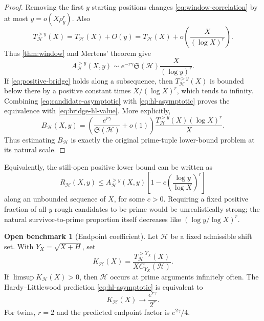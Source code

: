 \documentclass[11pt]{article}
\theoremstyle{definition}
\newtheorem{benchmark}[theorem]{Open benchmark}
\theoremstyle{remark}
\newcommand{\cH}{\mathcal H}
\begin{document}
\begin{proof}
Removing the first $y$ starting positions changes \eqref{eq:window-correlation} by at most $y=o(X\rho_y^r)$.  Also
\begin{equation}\label{eq:mesoscopic-prime-head}
    T_{\cH}^{>y}(X)=T_{\cH}(X)+O(y)
    =T_{\cH}(X)+o\left(\frac{X}{(\log X)^r}\right).
\end{equation}
Thus \cref{thm:window} and Mertens' theorem give
\begin{equation}\label{eq:candidate-asymptotic}
 A_{\cH}^{>y}(X,y)
 \sim e^{-r\gamma}\mathfrak S(\cH)
       \frac{X}{(\log y)^r}.
\end{equation}
If \eqref{eq:positive-bridge} holds along a subsequence, then $T_{\cH}^{>y}(X)$ is bounded below there by a positive constant times $X/(\log X)^r$, which tends to infinity.  Combining \eqref{eq:candidate-asymptotic} with \eqref{eq:hl-asymptotic} proves the equivalence with \eqref{eq:bridge-hl-value}.
More explicitly,
\begin{equation}\label{eq:bridge-benchmark-identity}
 B_{\cH}(X,y)
 =\left(\frac{e^{r\gamma}}{\mathfrak S(\cH)}+o(1)\right)
   \frac{T_{\cH}^{>y}(X)(\log X)^r}{X}.
\end{equation}
Thus estimating $B_{\cH}$ is exactly the original prime-tuple lower-bound problem at its natural scale.
\end{proof}

Equivalently, the still-open positive lower bound can be written as
\begin{equation}\label{eq:remainder-target}
 R_{\cH}(X,y)
 \le A_{\cH}^{>y}(X,y)
 \left[1-c\left(\frac{\log y}{\log X}\right)^r\right]
\end{equation}
along an unbounded sequence of $X$, for some $c>0$.  Requiring a fixed positive fraction of all $y$-rough candidates to be prime would be unrealistically strong; the natural survivor-to-prime proportion itself decreases like $(\log y/\log X)^r$.

\begin{benchmark}[Endpoint coefficient]\label{crit:endpoint}
Let $\cH$ be a fixed admissible shift set.  With $Y_X=\sqrt{X+H}$, set
\begin{equation}\label{eq:endpoint-coefficient}
    K_{\cH}(X)
    =\frac{T_{\cH}^{>Y_X}(X)}{X C_{Y_X}(\cH)}.
\end{equation}
If $\limsup K_{\cH}(X)>0$, then $\cH$ occurs at prime arguments infinitely often.  The Hardy--Littlewood prediction \eqref{eq:hl-asymptotic} is equivalent to
\begin{equation}\label{eq:endpoint-prediction}
    K_{\cH}(X)\longrightarrow\frac{e^{r\gamma}}{2^r}.
\end{equation}
For twins, $r=2$ and the predicted endpoint factor is $e^{2\gamma}/4$.
\end{benchmark}
\end{document}
